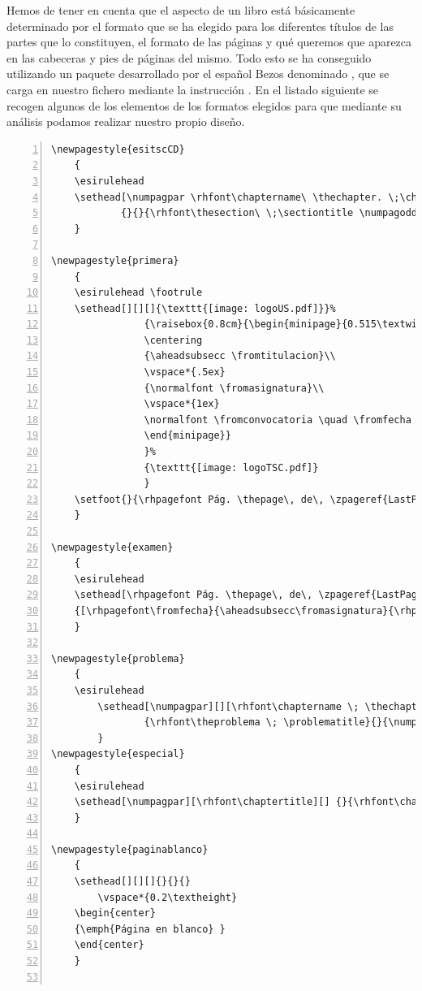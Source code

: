 Hemos de tener en cuenta que el aspecto de un libro está básicamente determinado por el formato que se ha elegido para los diferentes títulos de las partes que lo constituyen, el formato de las páginas y qué queremos que aparezca en las cabeceras y pies de páginas del mismo. Todo esto se ha conseguido utilizando un paquete desarrollado por el español Bezos denominado , que se carga en nuestro fichero mediante la instrucción . En el listado siguiente se recogen algunos de los elementos de los formatos elegidos para que mediante su análisis podamos realizar nuestro propio diseño.
\begin{lstlisting}[frame=none, numbers=left, xleftmargin=2.5em]
\newpagestyle{esitscCD}
	{
	\esirulehead
	\sethead[\numpagpar \rhfont\chaptername\ \thechapter. \;\chaptertitle][][]%
			{}{}{\rhfont\thesection\ \;\sectiontitle \numpagodd}
	}

\newpagestyle{primera}
	{
	\esirulehead \footrule
  	\sethead[][][]{\texttt{[image: logoUS.pdf]}}%
  				{\raisebox{0.8cm}{\begin{minipage}{0.515\textwidth}
				\centering
				{\aheadsubsecc \fromtitulacion}\\
				\vspace*{.5ex}
				{\normalfont \fromasignatura}\\
				\vspace*{1ex}
				\normalfont \fromconvocatoria \quad \fromfecha
				\end{minipage}}
				}%
				{\texttt{[image: logoTSC.pdf]}
				}
	\setfoot{}{\rhpagefont Pág. \thepage\, de\, \zpageref{LastPage}}{}
  	}

\newpagestyle{examen}
	{
	\esirulehead
	\sethead[\rhpagefont Pág. \thepage\, de\, \zpageref{LastPage}][\aheadsubsecc\fromasignatura][[\rhpagefont\fromfecha]%
	{[\rhpagefont\fromfecha}{\aheadsubsecc\fromasignatura}{\rhpagefont Pág. \thepage\, de\, \zpageref{LastPage}}
	}

\newpagestyle{problema}
	{
	\esirulehead
    	\sethead[\numpagpar][][\rhfont\chaptername \; \thechapter. \chaptertitle]% even
        		{\rhfont\theproblema \; \problematitle}{}{\numpagodd}% odd
    	}
\newpagestyle{especial}
	{ 
	\esirulehead
	\sethead[\numpagpar][\rhfont\chaptertitle][] {}{\rhfont\chaptertitle}{\numpagodd}
	}

\newpagestyle{paginablanco}
	{
  	\sethead[][][]{}{}{}
	    \vspace*{0.2\textheight}
    \begin{center}
    {\emph{Página en blanco} }
    \end{center}
	}
	

\end{lstlisting}
